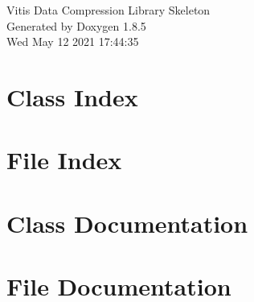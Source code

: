\documentclass[twoside]{book}
\newcommand{\clearemptydoublepage}{%
  \newpage{\pagestyle{empty}\cleardoublepage}%
}
\begin{document}
\hypersetup{pageanchor=false}
\begin{titlepage}
\vspace*{7cm}
\begin{center}%
{\Large Vitis Data Compression Library Skeleton }\\
\vspace*{1cm}
{\large Generated by Doxygen 1.8.5}\\
\vspace*{0.5cm}
{\small Wed May 12 2021 17:44:35}\\
\end{center}
\end{titlepage}
\clearemptydoublepage
\tableofcontents
\clearemptydoublepage
{}
\hypersetup{pageanchor=true}

\chapter{Class Index}

\chapter{File Index}

\chapter{Class Documentation}









\chapter{File Documentation}




























\newpage
{}
{}
\printindex
\end{document}
